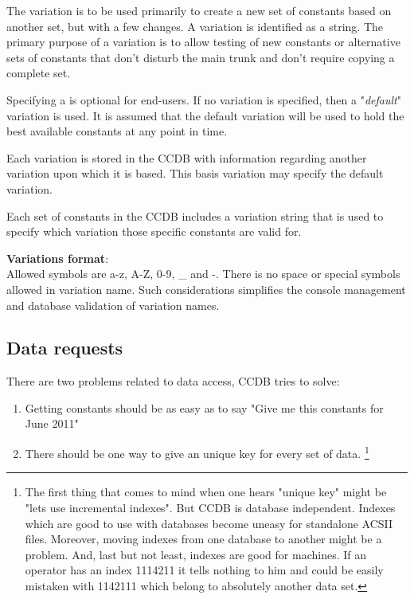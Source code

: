 \documentclass{article}
\begin{document}
The variation is to be used primarily to create a new set of constants based
on another set, but with a few changes. A variation is identified as a string. 
The primary purpose of a variation is to allow testing of new constants or
alternative sets of constants that don't disturb the main trunk and don't 
require copying a complete set.

Specifying a is optional for end-users. If no variation is specified, then a
"\textit{default}" variation is used. It is assumed that the default variation 
will be used to hold the best available constants at any point in time. 

Each variation is stored in the CCDB with information regarding another 
variation upon which it is based. This basis variation may specify the default variation.

Each set of constants in the CCDB includes a variation string that is used to
specify which variation those specific constants are valid for.

\textbf{Variations format}:\\
Allowed symbols are a-z, A-Z, 0-9, \_ and -. There is no space or special symbols
allowed in variation name. Such considerations simplifies the console management
and database validation of variation names.


\subsection{Data requests}

There are two problems related to data access, CCDB tries to solve:
\begin{enumerate}
  \item Getting constants should be as easy as to say 
        "Give me this constants for June 2011"

  \item There should be one way to give an unique key for every set of data.
  \footnote{
    The first thing that comes to mind when one hears "unique key" might be
    "lets use incremental indexes". But CCDB is database independent. Indexes
    which are good to use with databases become uneasy for standalone ACSII 
    files. Moreover, moving indexes from one database to another might be a 
    problem. And, last but not least, indexes are good for machines. If an 
    operator has an index 1114211 it tells nothing to him and could be easily
    mistaken with 1142111 which belong to absolutely another data set.
  }
\end{enumerate}
\vspace{1 em}
\end{document}
